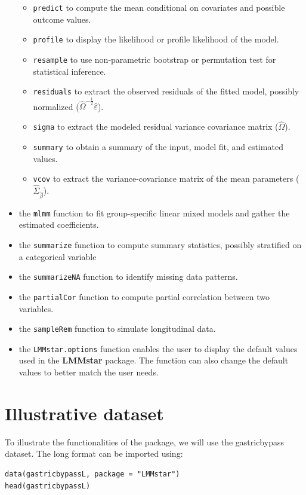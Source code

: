 \documentclass[12pt]{article}
\begin{document}
\begin{itemize}
\begin{itemize}
\item \texttt{predict} to compute the mean conditional on covariates and
possible outcome values.
\item \texttt{profile} to display the likelihood or profile likelihood of the model.
\item \texttt{resample} to use non-parametric bootstrap or permutation test for statistical inference.
\item \texttt{residuals} to extract the observed residuals of the fitted
model, possibly normalized
(\(\widehat{\Omega}^{-\frac{1}{2}}\widehat{\varepsilon}\)).
\item \texttt{sigma} to extract the modeled residual variance covariance matrix (\(\widehat{\Omega}\)).
\item \texttt{summary} to obtain a summary of the input, model fit, and estimated values.
\item \texttt{vcov} to extract the variance-covariance matrix of the mean
parameters (\(\widehat{\Sigma}_{\widehat{\beta}}\)).
\end{itemize}
\item the \texttt{mlmm} function to fit group-specific linear mixed models and
gather the estimated coefficients.
\item the \texttt{summarize} function to compute summary statistics, possibly
stratified on a categorical variable
\item the \texttt{summarizeNA} function to identify missing data patterns.
\item the \texttt{partialCor} function to compute partial correlation between two variables.
\item the \texttt{sampleRem} function to simulate longitudinal data.
\item the \texttt{LMMstar.options} function enables the user to display the
default values used in the \textbf{LMMstar} package. The function
can also change the default values to better match the user needs.
\end{itemize}


\clearpage

\section{Illustrative dataset}
\label{sec:org43fa78c}
To illustrate the functionalities of the package, we will use the
gastricbypass dataset. The long format can be imported using:
\lstset{language=r,label= ,caption= ,captionpos=b,numbers=none}
\begin{lstlisting}
data(gastricbypassL, package = "LMMstar")
head(gastricbypassL)
\end{lstlisting}
\end{document}
